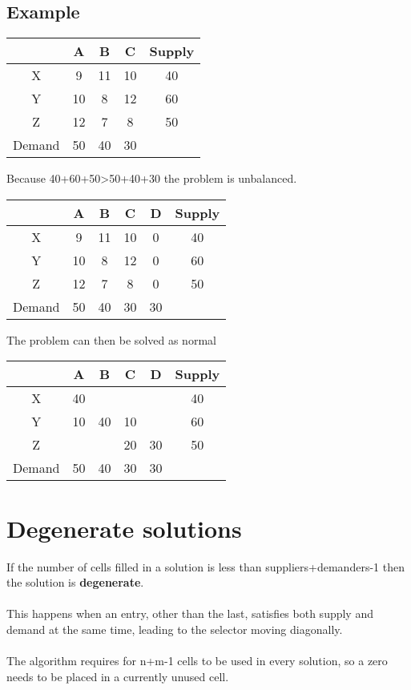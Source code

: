\documentclass{article}[18pt]
\newcommand{\cred}[1]{\color{red}#1}
\begin{document}
\subsection{Example}
\begin{center}
\begin{tabular}{ |c|c|c|c|c| }
\hline
&A&B&C&Supply\\
\hline
X&9&11&10&40\\
\hline
Y&10&8&12&60\\
\hline
Z&12&7&8&50\\
\hline
Demand&50&40&30&\\
\hline
\end{tabular}
\end{center}
Because 40+60+50>50+40+30 the problem is unbalanced.\\
\begin{center}
\begin{tabular}{ |c|c|c|c|c|c| }
\hline
&A&B&C&D&Supply\\
\hline
X&9&11&10&0&40\\
\hline
Y&10&8&12&0&60\\
\hline
Z&12&7&8&0&50\\
\hline
Demand&50&40&30&30&\\
\hline
\end{tabular}
\end{center}
The problem can then be solved as normal
\begin{center}
\begin{tabular}{ |c|c|c|c|c|c| }
\hline
&A&B&C&D&Supply\\
\hline
X&\cred{40}&&&&40\\
\hline
Y&\cred{10}&\cred{40}&\cred{10}&&60\\
\hline
Z&&&\cred{20}&\cred{30}&50\\
\hline
Demand&50&40&30&30&\\
\hline
\end{tabular}
\end{center}
\section{Degenerate solutions}
If the number of cells filled in a solution is less than suppliers+demanders-1 then the solution is \textbf{degenerate}.\\
\\
This happens when an entry, other than the last, satisfies both supply and demand at the same time, leading to the selector moving diagonally.\\
\\
The algorithm requires for n+m-1 cells to be used in every solution, so a zero needs to be placed in a currently unused cell.
\newpage
\end{document}
